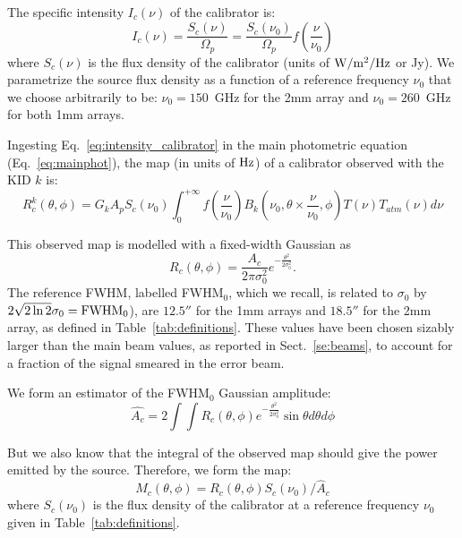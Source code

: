 The specific intensity $I_{c}(\nu)$ of the
calibrator is:
\begin{equation}
I_{c}(\nu) =  \frac{S_{c}(\nu)}{\Omega_{p}} =\frac{ S_{c}
  (\nu_{0})}{\Omega_{p}} f(\frac{\nu}{\nu_{0}})
\label{eq:intensity_calibrator}
\end{equation}
where $S_{c}(\nu)$ is the flux density of the calibrator (units
of $\rm W/m^{2}/Hz$ or Jy). We parametrize the source flux density
as a function of a reference frequency $\nu_{0}$ that we choose
arbitrarily to be: $\nu_{0} = 150$~GHz for the 2mm array and $\nu_{0}
= 260$~GHz for both 1mm arrays. 

Ingesting Eq.~\ref{eq:intensity_calibrator} in the main photometric
equation (Eq.~\ref{eq:mainphot}), the map (in units of $\rm Hz$) of a
calibrator observed with the KID $k$ is:
\begin{equation}
R_{c}^{k}(\theta, \phi) =  G_{k} A_{p} S_{c} (\nu_{0})  \int_{0}^{+\infty}
f(\frac{\nu}{\nu_{0}}) B_{k}(\nu_{0}, \theta \times \frac{\nu}{\nu_{0}},
\phi) T(\nu) T_{atm}(\nu) d\nu
\label{eq:mainbeammap}
\end{equation}

This observed map is modelled with a fixed-width Gaussian as 
\begin{equation} 
R_{c}(\theta, \phi)  = \frac{A_{c}}{2 \pi \sigma_{0}^{2}}
e^{-\frac{\theta^{2}}{2\sigma_{0}^{2}}}.
\label{eq:calfwhm0}
\end{equation}
The reference FWHM, labelled FWHM$_{0}$, which we recall, is related
to $\sigma_{0}$ by $2 \sqrt{2\ln{2}} \sigma_{0} = {\rm FWHM}_{0}$),
are $12.5''$ for the 1mm arrays and $18.5''$ for the 2mm
array, as defined in Table~\ref{tab:definitions}. These values have
been chosen sizably larger than the main beam values, as reported in
Sect.~\ref{se:beams}, to account for a fraction of the signal smeared 
in the error beam.


We form an estimator of the FWHM$_{0}$ Gaussian amplitude:
\begin{equation} 
\hat{A_{c}}  = 2 \int \int R_{c}(\theta, \phi)e^{-\frac{\theta^{2}}{2\sigma_{0}^{2}}} \sin \theta d\theta d\phi
\label{eq:fixed-width-gaussian-estimator}
\end{equation}

But we also know that the integral of the observed map should give the power
emitted by the source. Therefore, we form the map:
\begin{equation}
M_{c}(\theta, \phi) = R_{c}(\theta, \phi)   S_{c} (\nu_{0}) / \hat{A}_{c}
\end{equation}
where  $S_{c} (\nu_{0})$ is the flux density of the calibrator
at a reference frequency $\nu_{0}$ given in Table~\ref{tab:definitions}.

